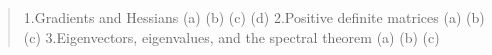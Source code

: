 \begin{abstract}
    1.Gradients and Hessians
    (a) 
    (b)
    (c)
    (d)
    2.Positive definite matrices
    (a)
    (b)
    (c)
    3.Eigenvectors, eigenvalues, and the spectral theorem
    (a)
    (b)
    (c)
\end{abstract}